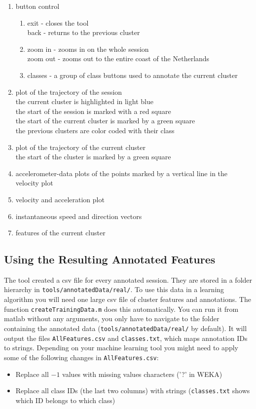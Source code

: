 \documentclass[a4paper, 11pt]{article}
\begin{document}
\begin{enumerate}
	\item button control
	\begin{enumerate}
		\item
		exit - closes the tool\\
		back - returns to the previous cluster
		\item
		zoom in - zooms in on the whole session\\
		zoom out - zooms out to the entire coast of the Netherlands
		\item
		classes - a group of class buttons used to annotate the current cluster
	\end{enumerate}
	\item
	plot of the trajectory of the session\\
	the current cluster is highlighted in light blue\\
	the start of the session is marked with a red square\\
	the start of the current cluster is marked by a green square\\
	the previous clusters are color coded with their class
	\item
	plot of the trajectory of the current cluster\\
	the start of the cluster is marked by a green square
	\item
	accelerometer-data plots of the points marked by a vertical line in the velocity plot
	\item
	velocity and acceleration plot
	\item
	instantaneous speed and direction vectors
	\item
	features of the current cluster
\end{enumerate}
		

\subsection{Using the Resulting Annotated Features}

The tool created a csv file for every annotated session. They are stored in a folder hierarchy in \verb|tools/annotatedData/real/|. To use this data in a learning algorithm you will need one large csv file of cluster features and annotations. The function \verb|createTrainingData.m| does this automatically. You can run it from matlab without any arguments, you only have to navigate to the folder containing the annotated data (\verb|tools/annotatedData/real/| by default). It will output the files \verb|AllFeatures.csv| and \verb|classes.txt|, which maps annotation IDs to strings.
Depending on your machine learning tool you might need to apply some of the following changes in \verb|AllFeatures.csv|:
\begin{itemize}
	\item Replace all $-1$ values with missing values characters ('?' in WEKA)
	\item Replace all class IDs (the last two columns) with strings (\verb|classes.txt| shows which ID belongs to which class)
\end{itemize}
\end{document}
